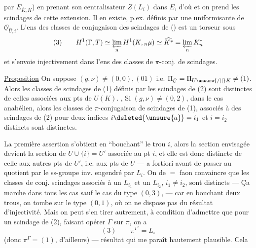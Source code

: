 
par $E_{\bar K,K}$) en prenant son centralisateur $Z(L_i)$ dans $E$, d'où
et on prend les scindages de cette extension. Il en existe, p.ex. définis par une uniformisante de $\underline{\mathcal O}_{\widehat U,i}$. L'ens des classes de conjugaison des  scindages  de () est un torseur sous 
\[
(3)\qquad H^1(\Gamma,T)\simeq\varprojlim_n H^1(K,{}_n\mu)\simeq\widehat{K^*}=\varprojlim_n K^*_n
\]
et  s'envoie injectivement  dans l'ens des classes de $\pi$-conj. de scindages.

\uline{Proposition} On suppose $(g,\nu)\ne(0,0),(01)$ i.e. $\Pi_{\bar U}=\Pi_{U\unsure{/|\mid}K}\ne(1)$. Alors les classes de  scindages  de (1) définis par les scindages de (2) sont distinctes de celles associées aux pts de $U(K)$. , Si  $(g,\nu)\ne(0,2)$,   dans le cas anabélien, alors les classes de $\pi$-conjugaison de scindages de (1), associés à des scindages de (2) pour deux indices $i\deleted{\unsure{a}}=i_1$ et $i=i_2$ distincts\unsure{,} sont distinctes.

La première assertion s'obtient en ``bouchant''
le trou $i$, alors la section envisagée devient
la section de $U\cup\{i\}=U'$ associée au pt $i$,
et elle est donc distincte de celle 
aux  autres pts de $U'$, i.e. aux pts de
$U$ --- a fortiori avant de passer au
quotient par le ss-groupe inv. engendré
par $L_i$. On  de $=$ faon 
convaincre que les classes de conj. 
scindages associés à un $L_{i_1}$ et un $L_{i_2}$, $i_1\ne i_2$,
sont distincts --- Ça marche dans tous les
cas sauf le cas du type $(0,3)$, ---
car en bouchant deux trous, on tombe
sur le type $(0,1)$, où on ne dispose pas
du résultat d'injectivité. Mais on
peut s'en tirer autrement, à condition
d'admettre que pour un scindage de
(2), faisant opérer $\Gamma$ sur $\pi$, on a
\[
(3)\qquad\pi^{\Gamma^\circ}=L_i
\]
(donc $\pi^\Gamma=(1)$, d'ailleurs) --- résultat
qui me paraît hautement plausible. Cela

